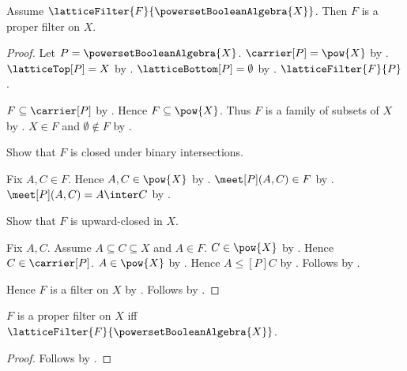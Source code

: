 \begin{proposition}\label{lattice_filter_on_powerset_boolean_algebra_is_proper_filter}
    Assume $\latticeFilter{F}{\powersetBooleanAlgebra{X}}$.
    Then $F$ is a proper filter on $X$.
\end{proposition}
\begin{proof}
    Let $P=\powersetBooleanAlgebra{X}$.
    $\carrier[P]=\pow{X}$ by
        .
    $\latticeTop[P]=X$ by
        .
    $\latticeBottom[P]=\emptyset$ by
        .
    $\latticeFilter{F}{P}$.

    $F\subseteq\carrier[P]$ by
        .
    Hence $F\subseteq\pow{X}$.
    Thus $F$ is a family of subsets of $X$ by
        .
    $X\in F$ and $\emptyset\notin F$ by
        .

    Show that $F$ is closed under binary intersections.
    \begin{subproof}
        Fix $A,C\in F$.
        Hence $A,C\in\pow{X}$ by .
        $\meet[P](A,C)\in F$ by .
        $\meet[P](A,C)=A\inter C$ by
            .
    \end{subproof}

    Show that $F$ is upward-closed in $X$.
    \begin{subproof}
        Fix $A,C$.
        Assume $A\subseteq C\subseteq X$ and $A\in F$.
        $C\in\pow{X}$ by .
        Hence $C\in\carrier[P]$.
        $A\in\pow{X}$ by .
        Hence $A\mathrel{\leq[P]}C$ by
            .
        Follows by .
    \end{subproof}
    Hence $F$ is a filter on $X$ by .
    Follows by .
\end{proof}

\begin{theorem}\label{proper_filter_iff_lattice_filter_on_powerset_boolean_algebra}
    $F$ is a proper filter on $X$ iff
        $\latticeFilter{F}{\powersetBooleanAlgebra{X}}$.
\end{theorem}
\begin{proof}
    Follows by
        .
\end{proof}

